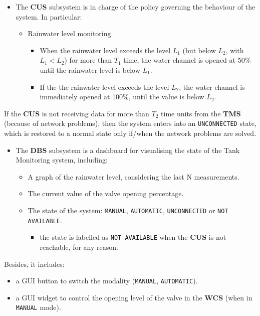\documentclass[12pt, letterpaper, twoside]{article}
\begin{document}
\begin{itemize}
    \item The \textbf{CUS} subsystem is in charge of the policy governing the behaviour of the system. In particular:
    \begin{itemize}
        \item Rainwater level monitoring
        \begin{itemize}
            \item When the rainwater level exceeds the level $L_1$ (but below $L_2$, with $L_1 < L_2$) for more than $T_1$ time, the water channel is opened at 50\% until the rainwater level is below $L_1$.
            \item If the the rainwater level exceeds the level $L_2$, the water channel is immediately opened at 100\%, until the value is below $L_2$.
        \end{itemize}
    \end{itemize}
\end{itemize}

If the \textbf{CUS} is not receiving data for more than $T_2$  time units from the \textbf{TMS} (because of network problems), then the system enters into an \texttt{UNCONNECTED} state, which is restored to a normal state only if/when the network problems are solved.

\begin{itemize}
    \item The \textbf{DBS} subsystem is a dashboard for visualising the state of the Tank Monitoring system, including:
    \begin{itemize}
        \item A graph of the rainwater level, considering the last N measurements.
        \item The current value of the valve opening percentage.
        \item The state of the system:  \texttt{MANUAL}, \texttt{AUTOMATIC}, \texttt{UNCONNECTED} or \texttt{NOT AVAILABLE}. 
        \begin{itemize}
            \item the state is labelled as \texttt{NOT AVAILABLE} when the \textbf{CUS} is not reachable, for any reason.
        \end{itemize}
    \end{itemize}
\end{itemize}
    
Besides, it includes: 
\begin{itemize}
    \item a GUI button to switch the modality (\texttt{MANUAL}, \texttt{AUTOMATIC}).
    \item a GUI widget to control the opening level of the valve in the \textbf{WCS} (when in \texttt{MANUAL} mode).
\end{itemize}
\end{document}
